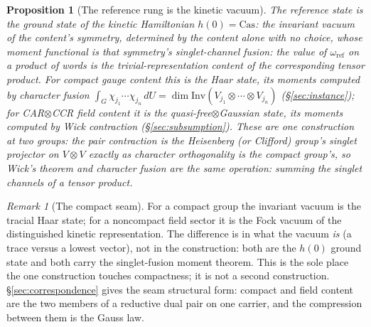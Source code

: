 \documentclass[11pt]{article}
\newtheorem{proposition}[theorem]{Proposition}
\theoremstyle{definition}
\theoremstyle{remark}
\newtheorem{remark}[theorem]{Remark}
\begin{document}
\begin{proposition}[The reference rung is the kinetic vacuum]
\label{prop:reference}
The reference state is the ground state of the kinetic Hamiltonian
$h(0) = \mathrm{Cas}$: the invariant vacuum of the content's symmetry,
determined by the content alone with no choice, whose moment functional is
that symmetry's singlet-channel fusion: the value of
$\omega_{\mathrm{ref}}$ on a product of words is the trivial-representation
content of the corresponding tensor product.  For compact gauge content
this is the Haar state, its moments computed by character fusion
$\int_G \chi_{j_1}\cdots\chi_{j_n}\,dU = \dim\mathrm{Inv}(V_{j_1}\otimes
\cdots\otimes V_{j_n})$ (\S\ref{sec:instance}); for CAR$\otimes$CCR field
content it is the quasi-free$\otimes$Gaussian state, its moments computed by
Wick contraction (\S\ref{sec:subsumption}).  These are one construction at
two groups: the pair contraction is the Heisenberg (or Clifford) group's
singlet projector on $V\otimes V$ exactly as character orthogonality is the
compact group's, so Wick's theorem and character fusion are the same
operation: summing the singlet channels of a tensor product.
\end{proposition}

\begin{remark}[The compact seam]\label{rem:refseam}
For a compact group the invariant vacuum is the tracial Haar state; for a
noncompact field sector it is the Fock vacuum of the distinguished kinetic
representation.  The difference is in what the vacuum \emph{is} (a trace
versus a lowest vector), not in the construction: both are the $h(0)$
ground state and both carry the singlet-fusion moment theorem.  This is the
sole place the one construction touches compactness; it is not a second
construction.  \S\ref{sec:correspondence} gives the seam structural
form: compact and field content are the two members of a reductive dual
pair on one carrier, and the compression between them is the Gauss law.
\end{remark}
\end{document}

